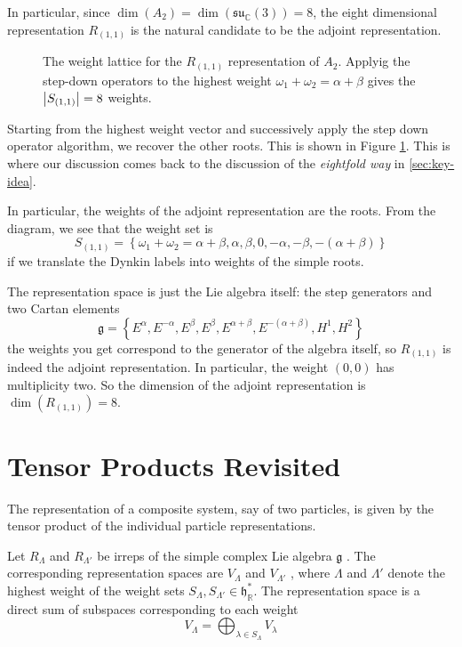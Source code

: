 In particular, since $\dim(A_2) = \dim(\mathfrak{su}_{\mathbb{C}}(3)) = 8$, the eight dimensional representation $R_{(1,1)}$ is the natural candidate to be the adjoint representation.

\begin{figure}[tbhp]
  \centering
  \def\svgwidth{0.4\columnwidth}
  
  \caption{The weight lattice for the $R_{(1, 1)}$ representation of $A_2$. Applyig the step-down operators to the highest weight $\omega_1 + \omega_2 = \alpha + \beta$ gives the $\abs{S_{(1, 1)}} = 8$ weights.}
  \label{fig:l23f1}
\end{figure}
Starting from the highest weight vector and successively apply the step down operator algorithm, we recover the other roots.
This is shown in Figure \ref{fig:l23f1}.
This is where our discussion comes back to the discussion of the \emph{eightfold way} in \ref{sec:key-idea}.

In particular, the weights of the adjoint representation are the roots. From the diagram, we see that the weight set is 
\begin{equation}
  S_{(1, 1)} = \left\{ \omega_1 + \omega_2 = \alpha + \beta, \alpha, \beta, 0, -\alpha, -\beta, -(\alpha + \beta) \right\}
\end{equation}
if we translate the Dynkin labels into weights of the simple roots.

The representation space is just the Lie algebra itself: the step generators and two Cartan elements
\begin{equation}
  \mathfrak{g} = \left\{ E^{\alpha}, E^{-\alpha}, E^{\beta}, E^{\beta}, E^{\alpha+ \beta}, E^{-(\alpha + \beta)}, H^1, H^2 \right\}
\end{equation}
the weights you get correspond to the generator of the algebra itself, so $R_{(1, 1)}$ is indeed the adjoint representation.
In particular, the weight $(0, 0)$ has multiplicity two.
So the dimension of the adjoint representation is $\dim(R_{(1,1)}) = 8$.

\section{Tensor Products Revisited}%
\label{sec:tensor_products_revisited}

The representation of a composite system, say of two particles, is given by the tensor product of the individual particle representations.

Let $R_{\Lambda}$ and $R_{\Lambda'}$  be irreps of the simple complex Lie algebra $\mathfrak{g}$ .
The corresponding representation spaces are $V_\Lambda$ and  $V_{\Lambda'}$ , where $\Lambda$ and  $\Lambda'$ denote the highest weight of the weight sets $S_{\Lambda}, S_{\Lambda'} \in \mathfrak{h}_{\mathbb{R}}^*$.
The representation space is a direct sum of subspaces corresponding to each weight
 \begin{equation}
  V_{\Lambda} = \bigoplus_{\lambda \in S_\Lambda} V_{\lambda}
\end{equation}

